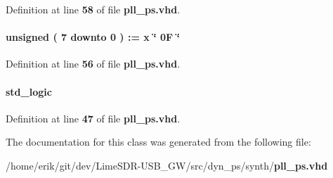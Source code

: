 Definition at line {\bf 58} of file {\bf pll\+\_\+ps.\+vhd}.

\paragraph[{timeout}]{ {\bfseries \textcolor{comment}{unsigned}\textcolor{vhdlchar}{ }\textcolor{vhdlchar}{(}\textcolor{vhdlchar}{ }\textcolor{vhdlchar}{ } \textcolor{vhdldigit}{7} \textcolor{vhdlchar}{ }\textcolor{keywordflow}{downto}\textcolor{vhdlchar}{ }\textcolor{vhdlchar}{ } \textcolor{vhdldigit}{0} \textcolor{vhdlchar}{ }\textcolor{vhdlchar}{)}\textcolor{vhdlchar}{ }\textcolor{vhdlchar}{ }\textcolor{vhdlchar}{ }\textcolor{vhdlchar}{\+:}\textcolor{vhdlchar}{=}\textcolor{vhdlchar}{ }\textcolor{vhdlchar}{ }\textcolor{vhdlchar}{x}\textcolor{vhdlchar}{ }\textcolor{keyword}{\char`\"{} 0\+F \char`\"{}}\textcolor{vhdlchar}{ }} \hspace{0.3cm}{\ttfamily [Constant]}}\label{classpll__ps_1_1arch_a3c3b2d7735d826f67011082e1512f2a7}


Definition at line {\bf 56} of file {\bf pll\+\_\+ps.\+vhd}.

\paragraph[{updown\+\_\+reg}]{ {\bfseries \textcolor{comment}{std\+\_\+logic}\textcolor{vhdlchar}{ }} \hspace{0.3cm}{\ttfamily [Signal]}}\label{classpll__ps_1_1arch_aa5bcf6253ca2eb39d5040938ac7feecc}


Definition at line {\bf 47} of file {\bf pll\+\_\+ps.\+vhd}.



The documentation for this class was generated from the following file\+:\begin{DoxyCompactItemize}
\item 
/home/erik/git/dev/\+Lime\+S\+D\+R-\/\+U\+S\+B\+\_\+\+G\+W/src/dyn\+\_\+ps/synth/{\bf pll\+\_\+ps.\+vhd}\end{DoxyCompactItemize}
